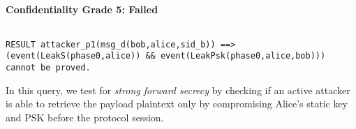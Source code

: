 \paragraph{Confidentiality Grade 5: Failed}$ $
\begin{lstlisting}
RESULT attacker_p1(msg_d(bob,alice,sid_b)) ==> (event(LeakS(phase0,alice)) && event(LeakPsk(phase0,alice,bob))) cannot be proved.
\end{lstlisting}

In this query, we test for \emph{strong forward secrecy} by checking if an active attacker is able to retrieve the payload plaintext only by compromising Alice's static key and PSK before the protocol session.


